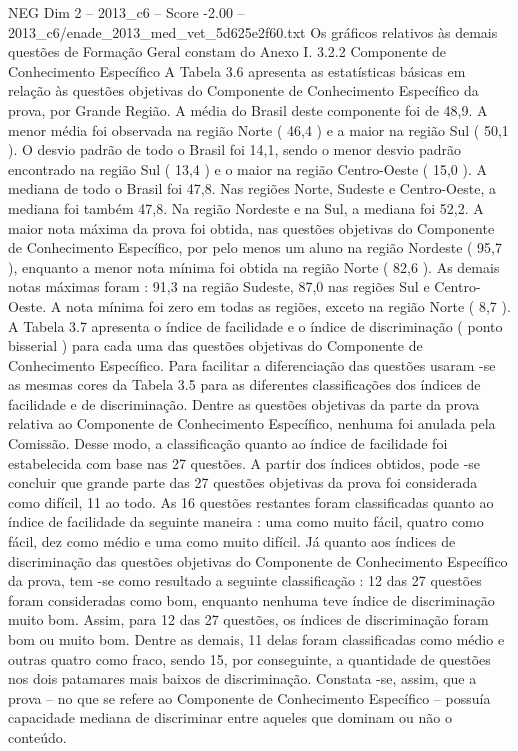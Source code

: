 \begin{textsample}{NEG Dim 2 – 2013\_c6 – Score -2.00 – 2013\_c6/enade\_2013\_med\_vet\_5d625e2f60.txt}
Os gráficos relativos às demais questões de Formação Geral constam do Anexo I. 3.2.2 Componente de Conhecimento Específico A Tabela 3.6 apresenta as estatísticas básicas em relação às questões objetivas do Componente de Conhecimento Específico da prova, por Grande Região.
A média do Brasil deste componente foi de 48,9.
A menor média foi observada na região Norte ( 46,4 ) e a maior na região Sul ( 50,1 ).
O desvio padrão de todo o Brasil foi 14,1, sendo o menor desvio padrão encontrado na região Sul ( 13,4 ) e o maior na região Centro-Oeste ( 15,0 ).
A mediana de todo o Brasil foi 47,8.
Nas regiões Norte, Sudeste e Centro-Oeste, a mediana foi também 47,8.
Na região Nordeste e na Sul, a mediana foi 52,2.
A maior nota máxima da prova foi obtida, nas questões objetivas do Componente de Conhecimento Específico, por pelo menos um aluno na região Nordeste ( 95,7 ), enquanto a menor nota mínima foi obtida na região Norte ( 82,6 ).
As demais notas máximas foram : 91,3 na região Sudeste, 87,0 nas regiões Sul e Centro-Oeste.
A nota mínima foi zero em todas as regiões, exceto na região Norte ( 8,7 ).
A Tabela 3.7 apresenta o índice de facilidade e o índice de discriminação ( ponto bisserial ) para cada uma das questões objetivas do Componente de Conhecimento Específico.
Para facilitar a diferenciação das questões usaram -se as mesmas cores da Tabela 3.5 para as diferentes classificações dos índices de facilidade e de discriminação.
Dentre as questões objetivas da parte da prova relativa ao Componente de Conhecimento Específico, nenhuma foi anulada pela Comissão.
Desse modo, a classificação quanto ao índice de facilidade foi estabelecida com base nas 27 questões.
A partir dos índices obtidos, pode -se concluir que grande parte das 27 questões objetivas da prova foi considerada como difícil, 11 ao todo.
As 16 questões restantes foram classificadas quanto ao índice de facilidade da seguinte maneira : uma como muito fácil, quatro como fácil, dez como médio e uma como muito difícil.
Já quanto aos índices de discriminação das questões objetivas do Componente de Conhecimento Específico da prova, tem -se como resultado a seguinte classificação : 12 das 27 questões foram consideradas como bom, enquanto nenhuma teve índice de discriminação muito bom.
Assim, para 12 das 27 questões, os índices de discriminação foram bom ou muito bom.
Dentre as demais, 11 delas foram classificadas como médio e outras quatro como fraco, sendo 15, por conseguinte, a quantidade de questões nos dois patamares mais baixos de discriminação.
Constata -se, assim, que a prova – no que se refere ao Componente de Conhecimento Específico – possuía capacidade mediana de discriminar entre aqueles que dominam ou não o conteúdo.

\end{textsample}
